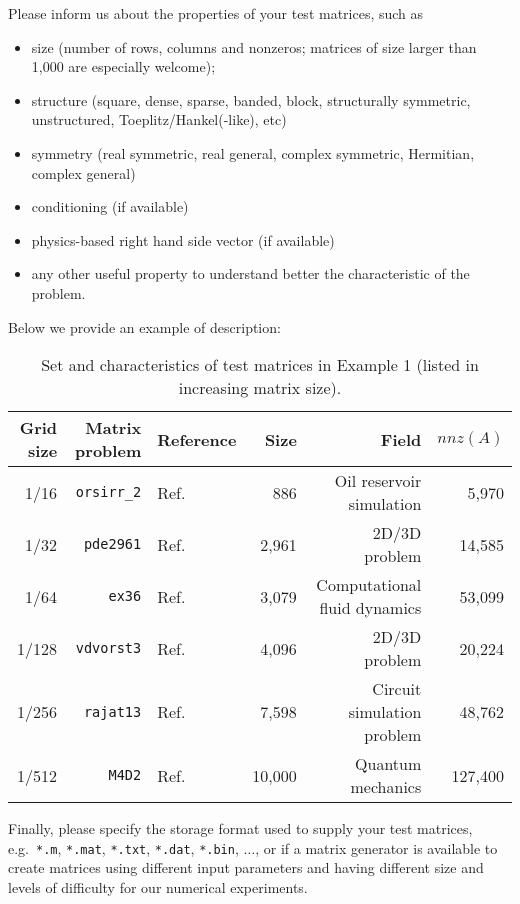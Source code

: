 \documentclass[12pt]{article}
\begin{document}
Please inform us about the properties of your test matrices, such as
\begin{itemize}
\item size (number of rows, columns and nonzeros; matrices of size larger than 1,000  are especially welcome);

\item structure (square, dense, sparse, banded, block, structurally symmetric, unstructured, Toeplitz/Hankel(-like), 
etc)
%
\item symmetry (real symmetric, real general, complex symmetric, Hermitian, complex general)
%
\item conditioning (if available)

\item physics-based right hand side vector (if available)
%
\item any other useful property to understand better the characteristic of the problem.
%
\end{itemize}
%
Below we provide an example of description:
\begin{table}[!htbp]\footnotesize\tabcolsep=7pt
\caption{{\small Set and characteristics of test matrices in Example 1 (listed in increasing matrix size).}}
\centering
\begin{tabular}{rrlrrr}
\toprule
Grid size &Matrix problem        &Reference          & Size    &Field                                   &$nnz(A)$   \\
\hline
1/16  &\texttt{orsirr\_2}    &Ref. \cite{1st} &886      &Oil reservoir simulation                &5,970      \\
1/32  &\texttt{pde2961}      &Ref. \cite{1st}  &2,961    &2D/3D problem                           &14,585     \\
1/64  &\texttt{ex36}         &Ref. \cite{2nd}  &3,079    &Computational fluid dynamics            &53,099     \\
1/128 &\texttt{vdvorst3}     &Ref. \cite{2nd}   &4,096   &2D/3D problem                           &20,224     \\
1/256 &\texttt{rajat13}      &Ref. \cite{3rd}  &7,598   &Circuit simulation problem              &48,762     \\
1/512 &\texttt{M4D2}         &Ref. \cite{3rd}  &10,000  &Quantum mechanics                       &127,400    \\
\bottomrule
\end{tabular}
\label{tab1}
\end{table}
%

Finally, please specify the storage format used to supply your test matrices, e.g.~\texttt{*.m}, \texttt{*.mat}, \texttt{*.txt},
\texttt{*.dat}, \texttt{*.bin}, $\ldots$, or if a matrix generator is available to create matrices using different  input parameters and having different size and levels of difficulty for our numerical experiments.
%
\end{document}
